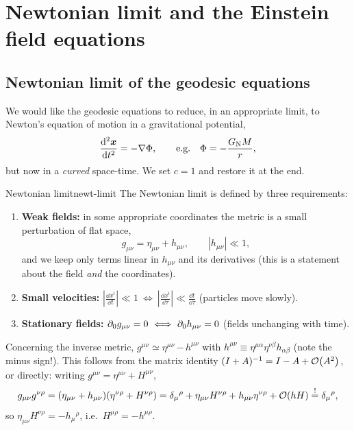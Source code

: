 \chapter{Newtonian limit and the Einstein field equations}\label{ch:efe}

\section{Newtonian limit of the geodesic equations}

We would like the geodesic equations to reduce, in an appropriate limit, to Newton's equation of motion in a gravitational potential,
\begin{equation}
  \frac{\mathrm{d}^2\bm{x}}{\mathrm{d} t^2}=-\nabla\Phi ,\qquad\text{e.g.}\quad\Phi=-\frac{G_{\mathrm N} M}{r},
\end{equation}
but now in a \emph{curved} space-time. We set $c=1$ and restore it at the end.

\begin{definition}{Newtonian limit}{newt-limit}
The Newtonian limit is defined by three requirements:
\begin{enumerate}
\item \textbf{Weak fields:} in some appropriate coordinates the metric is a small perturbation of flat space,
\begin{equation}
  g_{\mu\nu}=\eta_{\mu\nu}+h_{\mu\nu},\qquad|h_{\mu\nu}|\ll1,
\end{equation}
and we keep only terms linear in $h_{\mu\nu}$ and its derivatives (this is a statement about the field \emph{and} the coordinates).
\item \textbf{Small velocities:} $\left|\frac{\dd x^i}{\dd t}\right|\ll1\ \Longleftrightarrow\ \left|\frac{\dd x^i}{\dd\tau}\right|\ll\frac{\dd t}{\dd\tau}$ (particles move slowly).
\item \textbf{Stationary fields:} $\pd_0g_{\mu\nu}=0\ \Longleftrightarrow\ \pd_0h_{\mu\nu}=0$ (fields unchanging with time).
\end{enumerate}
\end{definition}

\begin{warningbox}
Concerning the inverse metric, $g^{\mu\nu}\simeq\eta^{\mu\nu}\,\boldsymbol{-}\,h^{\mu\nu}$ with $h^{\mu\nu}\equiv\eta^{\mu\alpha}\eta^{\nu\beta}h_{\alpha\beta}$ (note the minus sign!). This follows from the matrix identity $(I+A)^{-1}=I-A+\mathcal{O}\!\left(A^2\right)$, or directly: writing $g^{\mu\nu}=\eta^{\mu\nu}+H^{\mu\nu}$,
\[
  g_{\mu\nu}g^{\nu\rho}=(\eta_{\mu\nu}+h_{\mu\nu})(\eta^{\nu\rho}+H^{\nu\rho})=\delta_\mu{}^\rho+\eta_{\mu\nu}H^{\nu\rho}+h_{\mu\nu}\eta^{\nu\rho}+\mathcal{O}\!\left(hH\right)\overset{!}{=}\delta_\mu{}^\rho ,
\]
so $\eta_{\mu\nu}H^{\nu\rho}=-h_\mu{}^\rho$, i.e.\ $H^{\mu\rho}=-h^{\mu\rho}$.
\end{warningbox}

